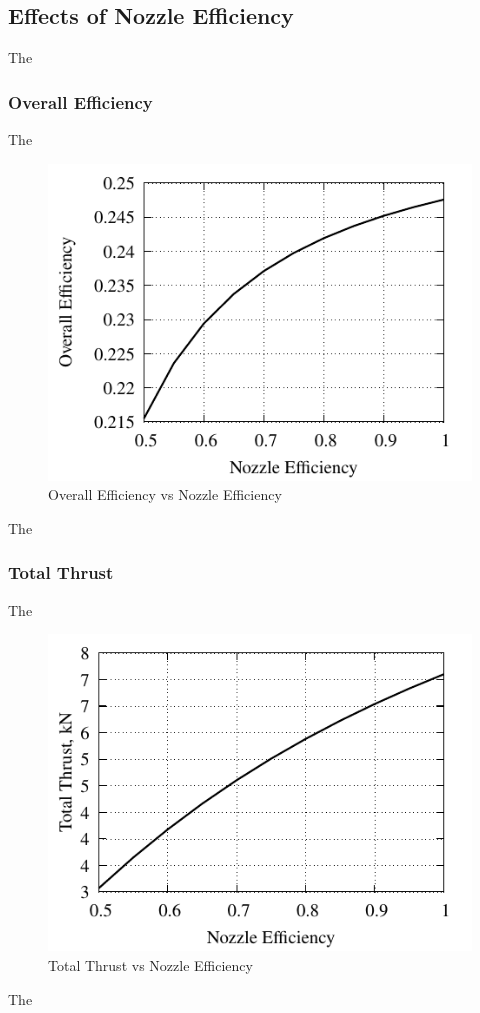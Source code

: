 \documentclass[conf]{new-aiaa} %
\begin{document}
\subsection{Effects of Nozzle Efficiency} %
The

\subsubsection{Overall Efficiency}
The

\begin{figure}[H] %
    \centering
    \includegraphics[]{media/performance_parameter_files/part_g_eta_o.pdf}
    \caption{\label{fig:partgetao}Overall Efficiency vs Nozzle Efficiency}
\end{figure}
The

\subsubsection{Total Thrust}
The

\begin{figure}[H] %
    \centering
    \includegraphics[]{media/performance_parameter_files/part_g_T.pdf}
    \caption{\label{fig:partgt}Total Thrust vs Nozzle Efficiency}
\end{figure}
The
\end{document}
